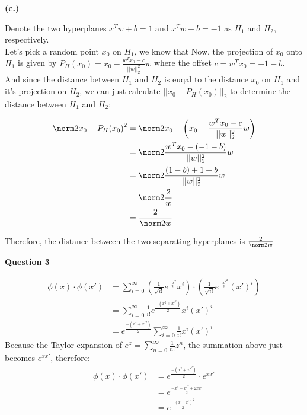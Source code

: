 \documentclass{article}
\begin{document}
\pagebreak
\vspace{5mm}\textbf{(c.)}
\begin{flushleft}
    Denote the two hyperplanes $x^T w + b = 1$ and $x^T w + b = -1$ as $H_1$ and $H_2$, respectively.\\
    Let's pick a random point $x_0$ on $H_1$, we know that 
    Now, the projection of $x_0$ onto $H_1$ is given by $P_H(x_0) = x_0 - \frac{w^Tx_0 - c}{||w||^2_2}w$ 
    where the offset $c = w^Tx_0 = -1 - b$.\\
    And since the distance between $H_1$ and $H_2$ is euqal to the distance $x_0$ on $H_1$ and it's projection on $H_2$,
    we can just calculate $||x_0 - P_H(x_0)||_2$ to determine the distance between $H_1$ and $H_2$:
\end{flushleft}
\begin{align*}
    \norm2{x_0 - P_H(x_0)}^2 &= \norm2{x_0 - \left(x_0 - \frac{w^Tx_0 - c}{||w||^2_2}w\right)}\\
    &=\norm2{\frac{w^Tx_0 - (-1 - b)}{||w||^2_2}w} \\
    &=\norm2{\frac{(1 - b) + 1 + b}{||w||^2_2}w} \\
    &=\norm2{\frac{2}{w}} \\
    &=\frac{2}{\norm2{w}} \\
\end{align*}
\begin{flushleft}
    Therefore, the distance between the two separating hyperplanes is $\frac{2}{\norm2{w}}$
\end{flushleft}


\pagebreak
\begin{spacing}{3}{\bfseries\LARGE Question 3}\end{spacing}
\begin{align*}
    \phi (x) \cdot \phi (x') &= \sum_{i=0}^{\infty}
    \left( \frac{1}{\sqrt{i!}} e^{\frac{-x^2}{2}}x^i \right) \cdot 
    \left( \frac{1}{\sqrt{i!}} e^{\frac{-x'^2}{2}}(x')^i \right)
    \\&= \sum_{i=0}^{\infty} \frac{1}{i!} e^{\frac{-(x^2+x'^2)}{2}} x^i(x')^i
    \\&= e^{\frac{-(x^2+x'^2)}{2}}
    \sum_{i=0}^{\infty} \frac{1}{i!} x^i(x')^i
\end{align*}
Because the Taylor expansion of $e^z = \sum_{n=0}^{\infty} \frac{1}{n!}z^n$, 
the summation above just becomes $e^{xx'}$, therefore:
\begin{align*}
    \phi (x) \cdot \phi (x') &= e^{\frac{-(x^2+x'^2)}{2}} \cdot e^{xx'}
    \\&= e^{\frac{-x^2 -x'^2 + 2xx'}{2}}
    \\&= e^{\frac{-(x - x')^2}{2}}
\end{align*}
\end{document}
